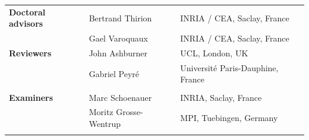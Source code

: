 \documentclass[nobib, a4paper, notoc, twoside, justified, openany]{tufte-book}
\begin{document}
\begin{titlepage}
\begin{fullwidth}
\begin{center}
{\LARGE
\begin{tabular}{lll}
\vspace{1pc}
\textbf{Doctoral advisors} & Bertrand Thirion & INRIA / CEA, Saclay, France \\
\vspace{1pc}
 & Gael Varoquaux & INRIA / CEA, Saclay, France \\
\vspace{1pc}
  \textbf{Reviewers} & John Ashburner  & UCL, London, UK  \\
  \vspace{1pc}  
& Gabriel Peyr\'e  & Universit\'e Paris-Dauphine, France  \\  \\
  \vspace{1pc}
\textbf{Examiners} & Marc Schoenauer & INRIA,  Saclay, France \\
  \vspace{1pc}
 & Moritz Grosse-Wentrup  & MPI, Tuebingen, Germany \\  
\vspace{1pc}
\end{tabular}
}


\end{center}
\end{fullwidth}
\end{titlepage}
\end{document}
